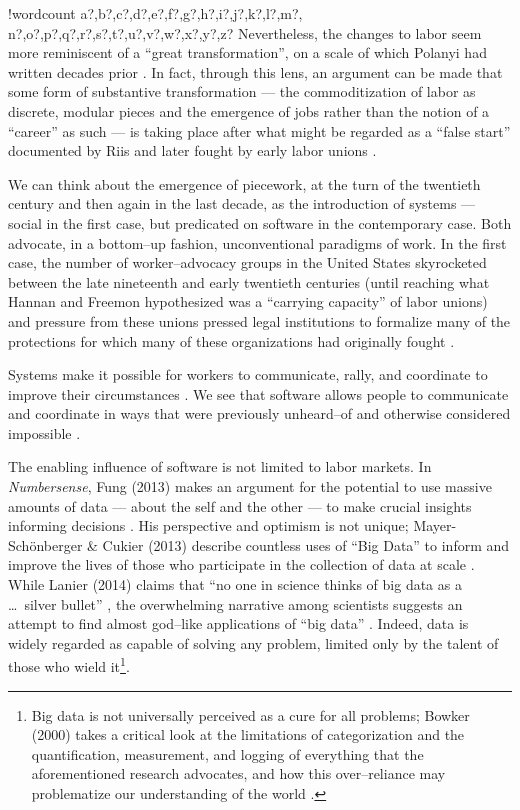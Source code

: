 \documentclass[11pt]{article}
\newcounter{words}
\newenvironment{counted}{%
  \setcounter{words}{0}
  \SearchList!{wordcount}{\stepcounter{words}}
    {a?,b?,c?,d?,e?,f?,g?,h?,i?,j?,k?,l?,m?,
    n?,o?,p?,q?,r?,s?,t?,u?,v?,w?,x?,y?,z?}
  \UndoBoundary{'}
  \SearchOrder{p;}}{%
  \StopSearching}
\begin{document}
\begin{counted}
Nevertheless, the changes to labor seem more reminiscent of a ``great transformation'', 
on a scale of which Polanyi had written decades prior
\cite{polanyi1944great}.
In fact, through this lens, an argument can be made that some form of substantive transformation
--- the commoditization of labor as discrete,
modular pieces and the emergence of jobs rather than the notion of a ``career'' as such ---
is taking place after what might be regarded as a ``false start''
documented by Riis and later fought by early labor unions
\cite{ebbinghaus1999institutions,riis2004other}.

We can think about the emergence of piecework,
at the turn of the twentieth century and then again in the last decade,
as the introduction of systems
--- social in the first case, but predicated on software in the contemporary case.
Both advocate, in a bottom--up fashion,
unconventional paradigms of work. %
In the first case,
the number of worker--advocacy groups in the United States skyrocketed between the late nineteenth and early twentieth centuries 
(until reaching what Hannan and Freemon hypothesized was a ``carrying capacity'' of labor unions)
and pressure from these unions pressed legal institutions to formalize many of the protections for which many of these organizations had originally fought
\cite{hannan1987ecology}.

Systems make it possible for workers to communicate, rally, and coordinate to improve their circumstances
\cite{turkopticon,dynamo,uberAlgorithm}.
We see that software allows people to communicate and coordinate in ways that were previously unheard--of and otherwise considered impossible
\cite{shirky2008here,miller2011understanding,costanza2014out}.

The enabling influence of software is not limited to labor markets.
In \textit{Numbersense}, Fung (2013) makes an argument for the potential to use massive amounts of data
--- about the self and the other ---
to make crucial insights informing decisions
\cite{fung2013numbersense}.
His perspective and optimism is not unique;
Mayer-Sch{\"o}nberger \& Cukier (2013) describe countless uses of ``Big Data'' to inform and improve the lives of those who participate in the collection of data at scale
\cite{mayer2013big}.
While Lanier (2014) claims that ``no one in science thinks of big data as a \ldots\ silver bullet''
\cite{lanier2014owns},
the overwhelming narrative among scientists suggests an attempt to find almost god--like applications of ``big data''
\cite{carrel2012quantified,li2011understanding,wolf2010data,bell2009total}.
Indeed, data is widely regarded as capable of solving any problem,
limited only by the talent of those who wield it\footnote{
Big data is not universally perceived as a cure for all problems;
Bowker (2000) takes a critical look at the limitations of categorization
and the quantification, measurement,
and logging of everything that the aforementioned research advocates,
and how this over--reliance may problematize our understanding of the world
\cite{bowker2000sorting}.}.


\end{counted}
\end{document}
